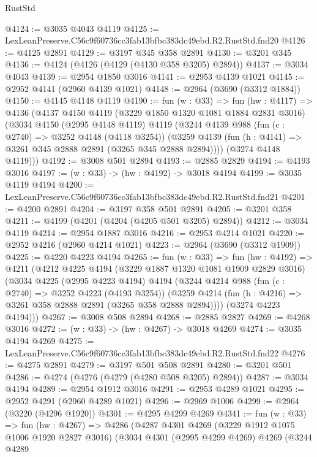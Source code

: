 \begin{lexlean}{RustStd}
\begin{coremodule}
@4124 := @3035 @4043 @4119
@4125 := LexLeanPreserve.C56c9f60736cc3fab13bfbc383dc49ebd.R2.RustStd.fnd20
@4126 := @4125 @2891
@4129 := @3197 @345 @358 @2891
@4130 := @3201 @345
@4136 := @4124 (@4126 (@4129 (@4130 @358 @3205) @2894))
@4137 := @3034 @4043
@4139 := @2954 @1850 @3016
@4141 := @2953 @4139 @1021
@4145 := @2952 @4141 (@2960 @4139 @1021)
@4148 := @2964 (@3690 (@3312 @1884))
@4150 := @4145 @4148 @4119
@4190 := fun (w : @33) =>
  fun (hw : @4117) =>
  @4136
    (@4137
      @4150
      @4119
      (@3229 @1850 @1320 @1081 @1884 @2831 @3016)
      (@3034
        @4150
        (@2995 @4148 @4119)
        @4119
        (@3244
          @4139
          @988
          (fun (c : @2740) => @3252 @4148 (@4118 @3254))
          (@3259 @4139 (fun (h : @4141) => @3261 @345 @2888 @2891 (@3265 @345 @2888 @2894))))
        (@3274 @4148 @4119)))
@4192 := @3008 @501 @2894
@4193 := @2885 @2829
@4194 := @4193 @3016
@4197 := (w : @33) -> (hw : @4192) -> @3018 @4194
@4199 := @3035 @4119 @4194
@4200 := LexLeanPreserve.C56c9f60736cc3fab13bfbc383dc49ebd.R2.RustStd.fnd21
@4201 := @4200 @2891
@4204 := @3197 @358 @501 @2891
@4205 := @3201 @358
@4211 := @4199 (@4201 (@4204 (@4205 @501 @3205) @2894))
@4212 := @3034 @4119
@4214 := @2954 @1887 @3016
@4216 := @2953 @4214 @1021
@4220 := @2952 @4216 (@2960 @4214 @1021)
@4223 := @2964 (@3690 (@3312 @1909))
@4225 := @4220 @4223 @4194
@4265 := fun (w : @33) =>
  fun (hw : @4192) =>
  @4211
    (@4212
      @4225
      @4194
      (@3229 @1887 @1320 @1081 @1909 @2829 @3016)
      (@3034
        @4225
        (@2995 @4223 @4194)
        @4194
        (@3244
          @4214
          @988
          (fun (c : @2740) => @3252 @4223 (@4193 @3254))
          (@3259 @4214 (fun (h : @4216) => @3261 @358 @2888 @2891 (@3265 @358 @2888 @2894))))
        (@3274 @4223 @4194)))
@4267 := @3008 @508 @2894
@4268 := @2885 @2827
@4269 := @4268 @3016
@4272 := (w : @33) -> (hw : @4267) -> @3018 @4269
@4274 := @3035 @4194 @4269
@4275 := LexLeanPreserve.C56c9f60736cc3fab13bfbc383dc49ebd.R2.RustStd.fnd22
@4276 := @4275 @2891
@4279 := @3197 @501 @508 @2891
@4280 := @3201 @501
@4286 := @4274 (@4276 (@4279 (@4280 @508 @3205) @2894))
@4287 := @3034 @4194
@4289 := @2954 @1912 @3016
@4291 := @2953 @4289 @1021
@4295 := @2952 @4291 (@2960 @4289 @1021)
@4296 := @2969 @1006
@4299 := @2964 (@3220 (@4296 @1920))
@4301 := @4295 @4299 @4269
@4341 := fun (w : @33) =>
  fun (hw : @4267) =>
  @4286
    (@4287
      @4301
      @4269
      (@3229 @1912 @1075 @1006 @1920 @2827 @3016)
      (@3034
        @4301
        (@2995 @4299 @4269)
        @4269
        (@3244
          @4289

\end{coremodule}
\end{lexlean}
